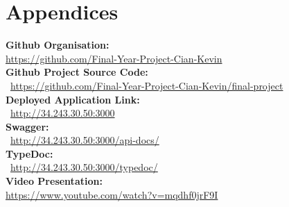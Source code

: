 \chapter{Appendices} \label{appen}

\textbf{Github Organisation: }\\ \noindent\textcolor{NavyBlue}{\url{https://github.com/Final-Year-Project-Cian-Kevin}}\\

\noindent\textbf{Github Project Source Code: }\\\ \noindent\textcolor{NavyBlue}{\url{https://github.com/Final-Year-Project-Cian-Kevin/final-project}}\\

\noindent\textbf{Deployed Application Link: }\\\ \noindent\textcolor{NavyBlue}{\url{http://34.243.30.50:3000}}\\

\noindent\textbf{Swagger: }\\\ \noindent\textcolor{NavyBlue}{\url{http://34.243.30.50:3000/api-docs/}}\\

\noindent\textbf{TypeDoc: }\\\ \noindent\textcolor{NavyBlue}{\url{http://34.243.30.50:3000/typedoc/}}\\

\noindent\textbf{Video Presentation: }\\ \noindent\textcolor{NavyBlue}{\url{https://www.youtube.com/watch?v=mqdhf0jrF9I}}